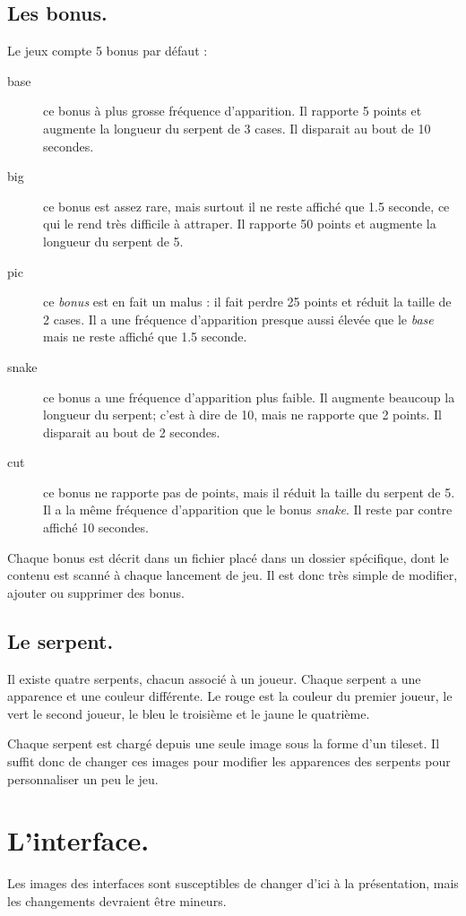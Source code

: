 \documentclass{article}
\begin{document}
\subsection{Les bonus.} \label{bonus}
Le jeux compte 5 bonus par défaut :\begin{description}
	\item[base] ce bonus à plus grosse fréquence d'apparition. Il rapporte 5 points et augmente la longueur du serpent de 3 cases. Il disparait au bout de 10 secondes.
	\item[big] ce bonus est assez rare, mais surtout il ne reste affiché que 1.5 seconde, ce qui le rend très difficile à attraper. Il rapporte 50 points et augmente la longueur du serpent de 5.
	\item[pic] ce \emph{bonus} est en fait un malus : il fait perdre 25 points et réduit la taille de 2 cases. Il a une fréquence d'apparition presque aussi élevée que le \emph{base} mais ne reste affiché que 1.5 seconde.
	\item[snake] ce bonus a une fréquence d'apparition plus faible. Il augmente beaucoup la longueur du serpent; c'est à dire de 10, mais ne rapporte que 2 points. Il disparait au bout de 2 secondes.
	\item[cut] ce bonus ne rapporte pas de points, mais il réduit la taille du serpent de 5. Il a la même fréquence d'apparition que le bonus \emph{snake}. Il reste par contre affiché 10 secondes.
\end{description}

Chaque bonus est décrit dans un fichier placé dans un dossier spécifique, dont le contenu est scanné à chaque lancement de jeu. Il est donc très simple de modifier, ajouter ou supprimer des bonus.

\subsection{Le serpent.} \label{snake}
Il existe quatre serpents, chacun associé à un joueur. Chaque serpent a une apparence et une couleur différente. Le rouge est la couleur du premier joueur, le vert le second joueur, le bleu le troisième et le jaune le quatrième.

Chaque serpent est chargé depuis une seule image sous la forme d'un tileset. Il suffit donc de changer ces images pour modifier les apparences des serpents pour personnaliser un peu le jeu.

\section{L'interface.}
Les images des interfaces sont susceptibles de changer d'ici à la présentation, mais les changements devraient être mineurs.
\end{document}
